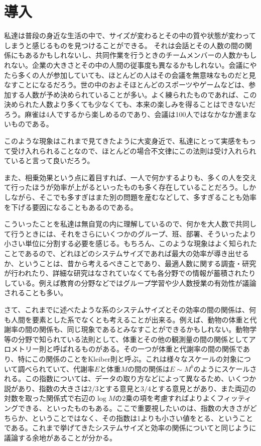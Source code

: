 \section{導入}

私達は普段の身近な生活の中で、サイズが変わるとその中の質や状態が変わってしまうと感じるものを見つけることができる。
それは会話とその人数の間の関係にもあるかもしれないし、共同作業を行うときのチームメンバーの人数かもしれない。企業の大きさとその中の人間の従事度も異なるかもしれない。会議にやたら多くの人が参加していても、ほとんどの人はその会議を無意味なものだと見なすことになるだろう。世の中のおよそほとんどのスポーツやゲームなどは、参加する人数が予め決められていることが多い。よく練られたものであれば、この決められた人数より多くても少なくても、本来の楽しみを得ることはできないだろう。麻雀は4人でするから楽しめるのであり、会議は100人ではなかなか進まないものである。

このような現象はこれまで見てきたように大変身近で、私達にとって実感をもって受け入れられることなので、ほとんどの場合不文律にこの法則は受け入れられていると言って良いだろう。

また、相乗効果という点に着目すれば、一人で何かするよりも、多くの人を交えて行ったほうが効率が上がるといったものも多く存在していることだろう。しかしながら、そこでも多すぎはまた別の問題を産むなどして、多すぎることも効率を下げる要因になることもあるのである。

こういったことを私達は無自覚の内に理解しているので、何かを大人数で共同して行うときには、それをさらにいくつかのグループ、班、部署、そういったより小さい単位に分割する必要を感じる。もちろん、このような現象はよく知られたことであるので、どれほどのシステムサイズであれば最大の効率が導き出せるか、ということは、昔から考えるべきことであり、最適人数に関する調査・研究が行われたり、詳細な研究はなされていなくても各分野での情報が蓄積されたりしている。例えば教育の分野などではグループ学習や少人数授業の有効性が議論されることも多い。

さて、これまでに述べたような系のシステムサイズとその効率の間の関係は、何も人間を要素とした系でなくとも考えることが出来る。例えば、動物の体重と代謝率の間の関係も、同じ現象であるとみなすことができるかもしれない。動物学等の分野で知られている法則として、体重とその他の観測量の間の関係としてアロメトリー則と呼ばれるものがある。その一つが体重と代謝率の間の関係であり、特にこの関係のことをKleiber則と呼ぶ。これは様々なスケールの対象について調べられていて、代謝率$E$と体重$M$の間の関係は$E\sim M^{b}$のようにスケールされる。この指数については、データの取り方などによって異なるため、いくつか説があり、指数の大きさは$2/3$とする意見と$3/4$とする意見とがあり、また両辺の対数を取った関係式で右辺の$\log M$の2乗の項を考慮すればよりよくフィッティングできる、といったものもある。ここで重要視したいのは、指数の大きさがどちらか、ということではなく、その指数は1よりも小さい値をとる、ということである。これまで挙げてきたシステムサイズと効率の関係についてと同じように議論する余地があることが分かる。

